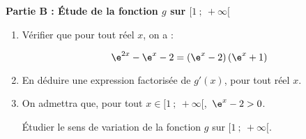 \bigskip

\textbf{Partie B : Étude de la fonction $g$ sur $[1~;~+\infty[$}

\medskip

\begin{enumerate}
\item Vérifier que pour tout réel $x$, on a :

\[\e^{2x} - \e^x - 2 = \left(\e^x - 2\right)\left(\e^x + 1\right)\]

\item En déduire une expression factorisée de $g'(x)$, pour tout réel $x$.
\item On admettra que, pour tout $x \in  [1~;~ +\infty[$,\, $\e^x - 2 > 0$.

 Étudier le sens de variation de la fonction $g$ sur $[1~;~ +\infty[$.
\end{enumerate}

